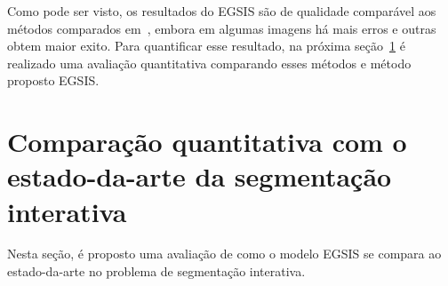 \begin{figure}[h!]
        \captionsetup{width=12cm}
		\centering
\end{figure}
\FloatBarrier{}



Como pode ser visto, os resultados do \gls{EGSIS} são de qualidade
comparável aos métodos comparados em~\cite{wang2023review}, embora em
algumas imagens há mais erros e outras obtem maior exito. Para
quantificar esse resultado, na próxima
seção~\ref{sec:comparacao-estado-da-arte} é realizado uma avaliação
quantitativa comparando esses métodos e método proposto \gls{EGSIS}.


\section{Comparação quantitativa com o estado-da-arte da segmentação interativa}\label{sec:comparacao-estado-da-arte}

Nesta seção, é proposto uma avaliação de como o modelo \gls{EGSIS} se
compara ao estado-da-arte no problema de segmentação interativa.

